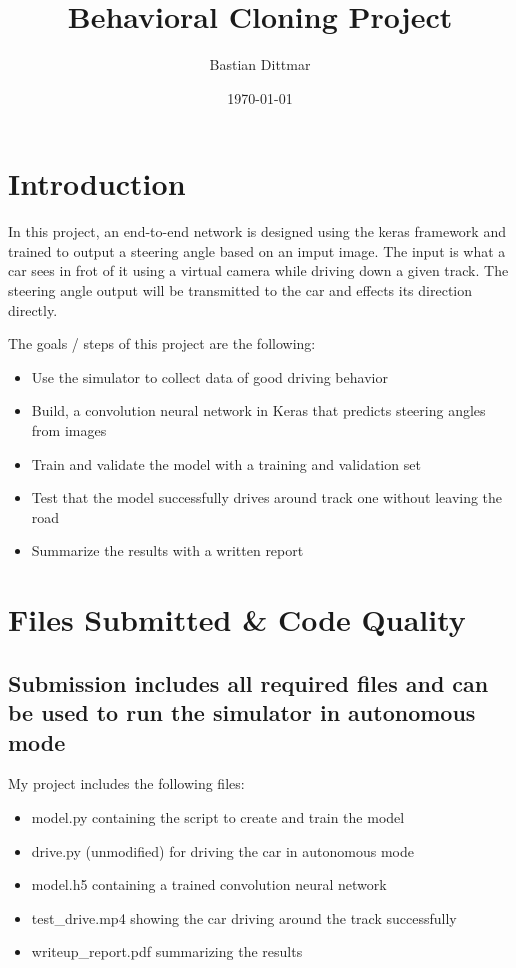 \documentclass[a4paper, 11pt, DIV=14]{scrartcl}
\author{Bastian Dittmar}
\date{\today}
\title{Behavioral Cloning Project}
\begin{document}
\maketitle


\section{Introduction}
In this project, an end-to-end network is designed using the keras framework and trained to output a steering angle based on an imput image. The input is what a car sees in frot of it using a virtual camera while driving down a given track. The steering angle output will be transmitted to the car and effects its direction directly.
\parencite{LeNet, AlexNet, Yadav, NVidia}

The goals / steps of this project are the following:
\begin{itemize}
\item Use the simulator to collect data of good driving behavior
\item Build, a convolution neural network in Keras that predicts steering angles from images
\item Train and validate the model with a training and validation set
\item Test that the model successfully drives around track one without leaving the road
\item Summarize the results with a written report
\end{itemize}


\section{Files Submitted \& Code Quality}

\subsection{Submission includes all required files and can be used to run the simulator in autonomous mode}

My project includes the following files:
\begin{itemize}
\item model.py containing the script to create and train the model
\item drive.py (unmodified) for driving the car in autonomous mode
\item model.h5 containing a trained convolution neural network
\item test\_drive.mp4 showing the car driving around the track successfully
\item writeup\_report.pdf summarizing the results
\end{itemize}
\end{document}
